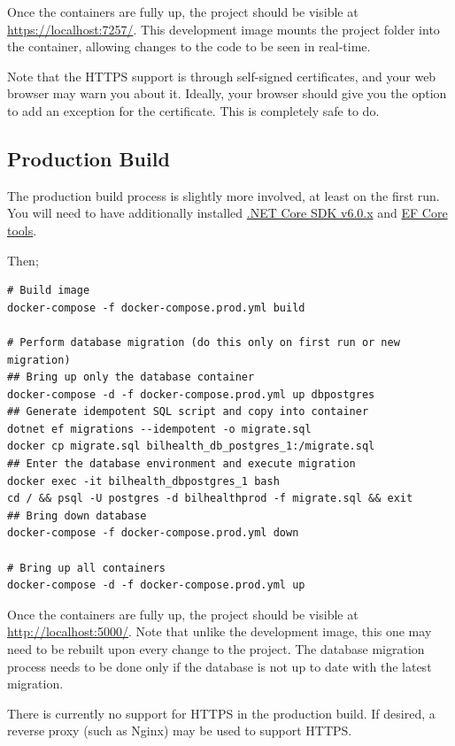 \documentclass[a4paper, 12pt, titlepage]{article}
\begin{document}
  Once the containers are fully up, the project should be visible at \url{https://localhost:7257/}. 
  This development image mounts the project folder into the container, allowing changes to the code to be seen in real-time.
  
  Note that the HTTPS support is through self-signed certificates, and your web browser may warn you about it.
  Ideally, your browser should give you the option to add an exception for the certificate.
  This is completely safe to do.
  
  \pagebreak
  \subsection{Production Build}
  
  The production build process is slightly more involved, at least on the first run.
  You will need to have additionally installed
  \href{https://dotnet.microsoft.com/en-us/download/dotnet/6.0}{.NET Core SDK v6.0.x} and
  \href{https://docs.microsoft.com/en-us/ef/core/cli/dotnet\#installing-the-tools}{EF Core tools}.
  
  Then;
  
  \begin{verbatim}
# Build image
docker-compose -f docker-compose.prod.yml build

# Perform database migration (do this only on first run or new migration)
## Bring up only the database container
docker-compose -d -f docker-compose.prod.yml up dbpostgres
## Generate idempotent SQL script and copy into container
dotnet ef migrations --idempotent -o migrate.sql
docker cp migrate.sql bilhealth_db_postgres_1:/migrate.sql
## Enter the database environment and execute migration
docker exec -it bilhealth_dbpostgres_1 bash
cd / && psql -U postgres -d bilhealthprod -f migrate.sql && exit
## Bring down database
docker-compose -f docker-compose.prod.yml down

# Bring up all containers
docker-compose -d -f docker-compose.prod.yml up
  \end{verbatim}
  
  Once the containers are fully up, the project should be visible at \url{http://localhost:5000/}.
  Note that unlike the development image, this one may need to be rebuilt upon every change to the project.
  The database migration process needs to be done only if the database is not up to date with the latest migration.
  
  There is currently no support for HTTPS in the production build.
  If desired, a reverse proxy (such as Nginx) may be used to support HTTPS.
  
\end{document}
